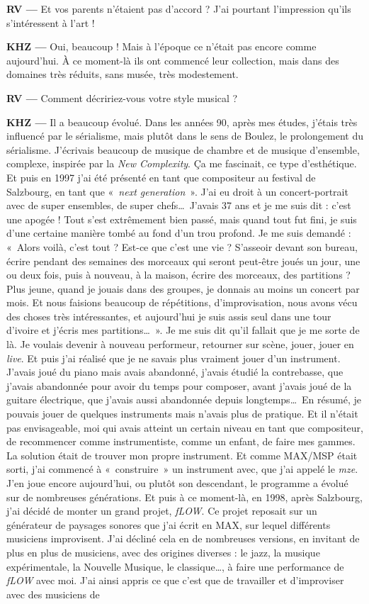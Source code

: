 \documentclass[a4paper,12pt]{article}
\newcommand{\guill}[1]{«~#1~»}
\newcommand{\maze}[0]{\emph{m\symbol{64}ze\textdegree2}}
\begin{document}
\textbf{RV ---} Et vos parents n'étaient pas d'accord ? J'ai pourtant l'impression qu'ils s'intéressent à l'art !

\textbf{KHZ ---} Oui, beaucoup ! Mais à l'époque ce n'était pas encore comme aujourd'hui. À ce moment-là ils ont commencé leur collection, mais dans des domaines très réduits, sans musée, très modestement.

\textbf{RV ---} Comment décririez-vous votre style musical ?

\textbf{KHZ ---} Il a beaucoup évolué. Dans les années 90, après mes études, j'étais très influencé par le sérialisme, mais plutôt dans le sens de Boulez, le prolongement du sérialisme. J'écrivais beaucoup de musique de chambre et de musique d'ensemble, complexe, inspirée par la \emph{New Complexity}. Ça me fascinait, ce type d'esthétique. Et puis en 1997 j'ai été présenté en tant que compositeur au festival de Salzbourg, en tant que \guill{\emph{next generation}}. J'ai eu droit à un concert-portrait avec de super ensembles, de super chefs\dots~J'avais 37 ans et je me suis dit : c'est une apogée ! Tout s'est extrêmement bien passé, mais quand tout fut fini, je suis d'une certaine manière tombé au fond d'un trou profond. Je me suis demandé : \guill{Alors voilà, c'est tout ? Est-ce que c'est une vie ? S'asseoir devant son bureau, écrire pendant des semaines des morceaux qui seront peut-être joués un jour, une ou deux fois, puis à nouveau, à la maison, écrire des morceaux, des partitions ? Plus jeune, quand je jouais dans des groupes, je donnais au moins un concert par mois. Et nous faisions beaucoup de répétitions, d'improvisation, nous avons vécu des choses très intéressantes, et aujourd'hui je suis assis seul dans une tour d'ivoire et j'écris mes partitions\dots}. Je me suis dit qu'il fallait que je me sorte de là. Je voulais devenir à nouveau performeur, retourner sur scène, jouer, jouer en \emph{live}. Et puis j'ai réalisé que je ne savais plus vraiment jouer d'un instrument. J'avais joué du piano mais avais abandonné, j'avais étudié la contrebasse, que j'avais abandonnée pour avoir du temps pour composer, avant j'avais joué de la guitare électrique, que j'avais aussi abandonnée depuis longtemps\dots~En résumé, je pouvais jouer de quelques instruments mais n'avais plus de pratique. Et il n'était pas envisageable, moi qui avais atteint un certain niveau en tant que compositeur, de recommencer comme instrumentiste, comme un enfant, de faire mes gammes. La solution était de trouver mon propre instrument. Et comme MAX/MSP était sorti, j'ai commencé à \guill{construire} un instrument avec, que j'ai appelé le \maze. J'en joue encore aujourd'hui, ou plutôt son descendant, le programme a évolué sur de nombreuses générations. Et puis à ce moment-là, en 1998, après Salzbourg, j'ai décidé de monter un grand projet, \emph{fLOW}. Ce projet reposait sur un générateur de paysages sonores que j'ai écrit en MAX, sur lequel différents musiciens improvisent. J'ai décliné cela en de nombreuses versions, en invitant de plus en plus de musiciens, avec des origines diverses : le jazz, la musique expérimentale, la Nouvelle Musique, le classique\dots, à faire une performance de \emph{fLOW} avec moi. J'ai ainsi appris ce que c'est que de travailler et d'improviser avec des musiciens de 
\end{document}
